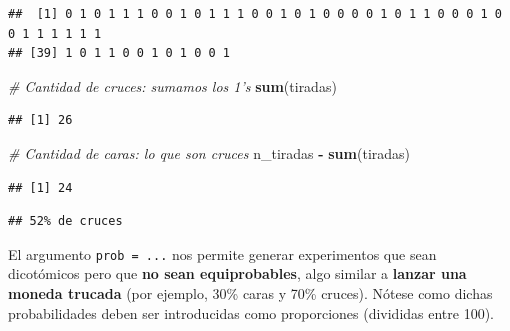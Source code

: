 \documentclass[11pt,]{book}
\newenvironment{Shaded}{\begin{snugshade}}{\end{snugshade}}
\newcommand{\CommentTok}[1]{\textcolor[rgb]{0.37,0.37,0.37}{\textit{#1}}}
\newcommand{\DataTypeTok}[1]{\textcolor[rgb]{0.27,0.27,0.27}{#1}}
\newcommand{\DecValTok}[1]{\textcolor[rgb]{0.06,0.06,0.06}{#1}}
\newcommand{\FloatTok}[1]{\textcolor[rgb]{0.06,0.06,0.06}{#1}}
\newcommand{\KeywordTok}[1]{\textcolor[rgb]{0.27,0.27,0.27}{\textbf{#1}}}
\newcommand{\NormalTok}[1]{#1}
\newcommand{\OperatorTok}[1]{\textcolor[rgb]{0.43,0.43,0.43}{\textbf{#1}}}
\newcommand{\OtherTok}[1]{\textcolor[rgb]{0.37,0.37,0.37}{#1}}
\newcommand{\StringTok}[1]{\textcolor[rgb]{0.5,0.5,0.5}{#1}}
\begin{document}
\begin{verbatim}
##  [1] 0 1 0 1 1 1 0 0 1 0 1 1 1 0 0 1 0 1 0 0 0 0 1 0 1 1 0 0 0 1 0 0 1 1 1 1 1 1
## [39] 1 0 1 1 0 0 1 0 1 0 0 1
\end{verbatim}

\begin{Shaded}
\begin{Highlighting}[]
\CommentTok{# Cantidad de cruces: sumamos los 1's}
\KeywordTok{sum}\NormalTok{(tiradas)}
\end{Highlighting}
\end{Shaded}

\begin{verbatim}
## [1] 26
\end{verbatim}

\begin{Shaded}
\begin{Highlighting}[]
\CommentTok{# Cantidad de caras: lo que son cruces}
\NormalTok{n_tiradas }\OperatorTok{-}\StringTok{ }\KeywordTok{sum}\NormalTok{(tiradas)}
\end{Highlighting}
\end{Shaded}

\begin{verbatim}
## [1] 24
\end{verbatim}

\begin{Shaded}
\end{Shaded}

\begin{verbatim}
## 52% de cruces
\end{verbatim}

El argumento \texttt{prob\ =\ ...} nos permite generar experimentos que sean dicotómicos pero que \textbf{no sean equiprobables}, algo similar a \textbf{lanzar una moneda trucada} (por ejemplo, 30\% caras y 70\% cruces). Nótese como dichas probabilidades deben ser introducidas como proporciones (divididas entre 100).

\begin{Shaded}
\end{Shaded}
\end{document}
